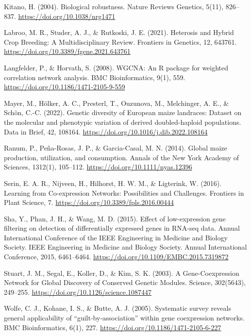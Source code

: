 \documentclass[
]{article}
\begin{document}
Kitano, H. (2004). Biological robustness. Nature Reviews Genetics,
5(11), 826--837.
\href{https://doi.org/10.1038/nrg1471}{{https://doi.org/10.1038/nrg1471}}

Labroo, M. R., Studer, A. J., \& Rutkoski, J. E. (2021). Heterosis and
Hybrid Crop Breeding: A Multidisciplinary Review. Frontiers in Genetics,
12, 643761.
\href{https://doi.org/10.3389/fgene.2021.643761}{{https://doi.org/10.3389/fgene.2021.643761}}

Langfelder, P., \& Horvath, S. (2008). WGCNA: An R package for weighted
correlation network analysis. BMC Bioinformatics, 9(1), 559.
\href{https://doi.org/10.1186/1471-2105-9-559}{{https://doi.org/10.1186/1471-2105-9-559}}

Mayer, M., Hölker, A. C., Presterl, T., Ouzunova, M., Melchinger, A. E.,
\& Schön, C.-C. (2022). Genetic diversity of European maize landraces:
Dataset on the molecular and phenotypic variation of derived
doubled-haploid populations. Data in Brief, 42, 108164.
\href{https://doi.org/10.1016/j.dib.2022.108164}{{https://doi.org/10.1016/j.dib.2022.108164}}

Ranum, P., Peña-Rosas, J. P., \& Garcia-Casal, M. N. (2014). Global
maize production, utilization, and consumption. Annals of the New York
Academy of Sciences, 1312(1), 105--112.
\href{https://doi.org/10.1111/nyas.12396}{{https://doi.org/10.1111/nyas.12396}}

Serin, E. A. R., Nijveen, H., Hilhorst, H. W. M., \& Ligterink, W.
(2016). Learning from Co-expression Networks: Possibilities and
Challenges. Frontiers in Plant Science, 7.
\href{https://doi.org/10.3389/fpls.2016.00444}{{https://doi.org/10.3389/fpls.2016.00444}}

Sha, Y., Phan, J. H., \& Wang, M. D. (2015). Effect of low-expression
gene filtering on detection of differentially expressed genes in RNA-seq
data. Annual International Conference of the IEEE Engineering in
Medicine and Biology Society. IEEE Engineering in Medicine and Biology
Society. Annual International Conference, 2015, 6461--6464.
\href{https://doi.org/10.1109/EMBC.2015.7319872}{{https://doi.org/10.1109/EMBC.2015.7319872}}

Stuart, J. M., Segal, E., Koller, D., \& Kim, S. K. (2003). A
Gene-Coexpression Network for Global Discovery of Conserved Genetic
Modules. Science, 302(5643), 249--255.
\href{https://doi.org/10.1126/science.1087447}{{https://doi.org/10.1126/science.1087447}}

Wolfe, C. J., Kohane, I. S., \& Butte, A. J. (2005). Systematic survey
reveals general applicability of ``guilt-by-association'' within gene
coexpression networks. BMC Bioinformatics, 6(1), 227.
\href{https://doi.org/10.1186/1471-2105-6-227}{{https://doi.org/10.1186/1471-2105-6-227}}
\end{document}
